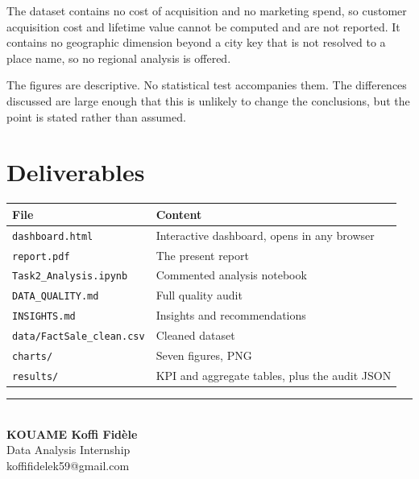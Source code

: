 \documentclass[11pt,a4paper]{article}
\begin{document}
The dataset contains no cost of acquisition and no marketing spend, so customer
acquisition cost and lifetime value cannot be computed and are not reported. It contains
no geographic dimension beyond a city key that is not resolved to a place name, so no
regional analysis is offered.

The figures are descriptive. No statistical test accompanies them. The differences
discussed are large enough that this is unlikely to change the conclusions, but the point
is stated rather than assumed.

\section*{Deliverables}

\begin{table}[H]\centering\small
\begin{tabular}{@{}ll@{}}\toprule
\textbf{File} & \textbf{Content} \\ \midrule
\texttt{dashboard.html} & Interactive dashboard, opens in any browser \\
\texttt{report.pdf} & The present report \\
\texttt{Task2\_Analysis.ipynb} & Commented analysis notebook \\
\texttt{DATA\_QUALITY.md} & Full quality audit \\
\texttt{INSIGHTS.md} & Insights and recommendations \\
\texttt{data/FactSale\_clean.csv} & Cleaned dataset \\
\texttt{charts/} & Seven figures, PNG \\
\texttt{results/} & KPI and aggregate tables, plus the audit JSON \\
\bottomrule\end{tabular}\end{table}

\vspace{1.2cm}\noindent\rule{\linewidth}{0.4pt}\\[3pt]
{\small\textbf{KOUAME Koffi Fid\`ele}\\ Data Analysis Internship\\ koffifidelek59@gmail.com}
\end{document}
